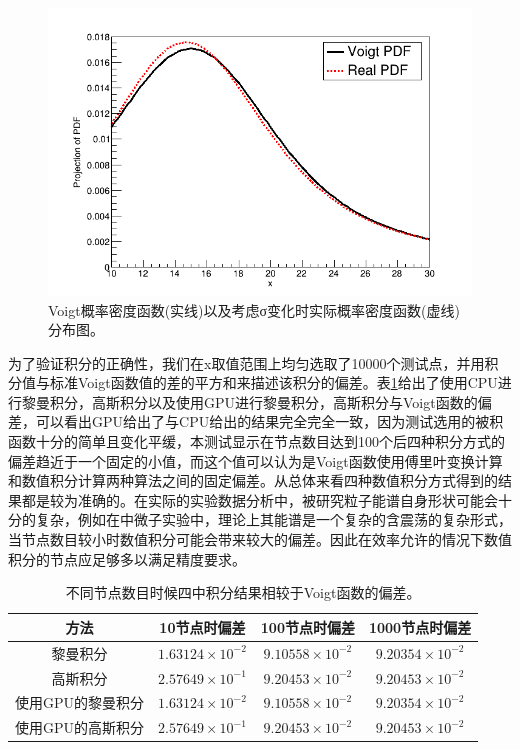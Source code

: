 \begin{figure}
    \centering
    \includegraphics[width=0.6\columnwidth]{pic/cuda1.png}
    \caption{ Voigt概率密度函数(实线)以及考虑σ变化时实际概率密度函数(虚线)分布图。}
    \label{fig:cuda_com}
\end{figure}

为了验证积分的正确性，我们在x取值范围上均匀选取了10000个测试点，并用积分值与标准Voigt函数值的差的平方和来描述该积分的偏差。表\ref{tab:cuda_dif}给出了使用CPU进行黎曼积分，高斯积分以及使用GPU进行黎曼积分，高斯积分与Voigt函数的偏差，可以看出GPU给出了与CPU给出的结果完全完全一致，因为测试选用的被积函数十分的简单且变化平缓，本测试显示在节点数目达到100个后四种积分方式的偏差趋近于一个固定的小值，而这个值可以认为是Voigt函数使用傅里叶变换计算和数值积分计算两种算法之间的固定偏差。从总体来看四种数值积分方式得到的结果都是较为准确的。在实际的实验数据分析中，被研究粒子能谱自身形状可能会十分的复杂，例如在中微子实验中，理论上其能谱是一个复杂的含震荡的复杂形式，当节点数目较小时数值积分可能会带来较大的偏差。因此在效率允许的情况下数值积分的节点应足够多以满足精度要求。

\begin{table}
    \centering
    \begin{tabular*}{\textwidth}{@{\extracolsep{\fill}}cccc}
        \hline
        \hline							
        方法	&	10节点时偏差	&	100节点时偏差	&	1000节点时偏差	\\\hline
        黎曼积分	&	$1.63124\times10^{-2}$	&	$9.10558\times10^{-2}$	&	$9.20354\times10^{-2}$	\\
        高斯积分	&	$2.57649\times10^{-1}$	&	$9.20453\times10^{-2}$	&	$9.20453\times10^{-2}$	\\
        使用GPU的黎曼积分	&	$1.63124\times10^{-2}$	&	$9.10558\times10^{-2}$	&	$9.20354\times10^{-2}$	\\
        使用GPU的高斯积分	&	$2.57649\times10^{-1}$	&	$9.20453\times10^{-2}$	&	$9.20453\times10^{-2}$	\\
        \hline
        \hline
    \end{tabular*}
    \caption{不同节点数目时候四中积分结果相较于Voigt函数的偏差。}
    \label{tab:cuda_dif}
\end{table}

